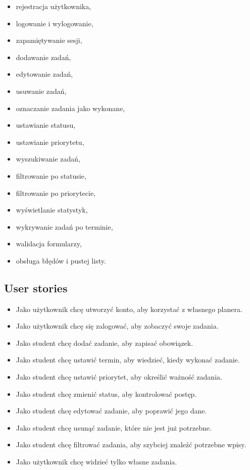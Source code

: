 \documentclass[12pt,a4paper]{article}
\begin{document}
\begin{itemize}[leftmargin=*]
    \item rejestracja użytkownika,
    \item logowanie i wylogowanie,
    \item zapamiętywanie sesji,
    \item dodawanie zadań,
    \item edytowanie zadań,
    \item usuwanie zadań,
    \item oznaczanie zadania jako wykonane,
    \item ustawianie statusu,
    \item ustawianie priorytetu,
    \item wyszukiwanie zadań,
    \item filtrowanie po statusie,
    \item filtrowanie po priorytecie,
    \item wyświetlanie statystyk,
    \item wykrywanie zadań po terminie,
    \item walidacja formularzy,
    \item obsługa błędów i pustej listy.
\end{itemize}

\subsection{User stories}

\begin{itemize}[leftmargin=*]
    \item Jako użytkownik chcę utworzyć konto, aby korzystać z własnego planera.
    \item Jako użytkownik chcę się zalogować, aby zobaczyć swoje zadania.
    \item Jako student chcę dodać zadanie, aby zapisać obowiązek.
    \item Jako student chcę ustawić termin, aby wiedzieć, kiedy wykonać zadanie.
    \item Jako student chcę ustawić priorytet, aby określić ważność zadania.
    \item Jako student chcę zmienić status, aby kontrolować postęp.
    \item Jako student chcę edytować zadanie, aby poprawić jego dane.
    \item Jako student chcę usunąć zadanie, które nie jest już potrzebne.
    \item Jako student chcę filtrować zadania, aby szybciej znaleźć potrzebne wpisy.
    \item Jako użytkownik chcę widzieć tylko własne zadania.
\end{itemize}
\end{document}

